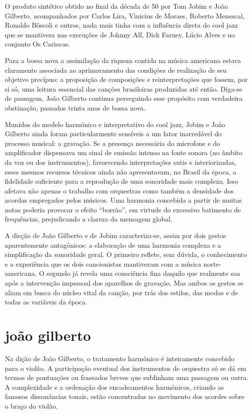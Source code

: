 O produto sintético obtido no final da década de 50 por Tom Jobim e João
Gilberto, acompanhados por Carlos Lira, Vinicius de Moraes, Roberto
Menescal, Ronaldo Bôscoli e outros, nada mais tinha com a influência
direta do cool jazz que se mantivera nas execuções de Johnny Alf, Dick
Farney, Lúcio Alves e no conjunto Os Cariocas.

Para a bossa nova a assimilação da riqueza contida na música americana
estava claramente associada ao aprimoramento das condições de realização
de seu objetivo precípuo: a proposição de composições e reinterpretações
que fossem, por si só, uma leitura essencial das canções brasileiras
produzidas até então. Diga-se de passagem, João Gilberto continua
perseguindo esse propósito com verdadeira obstinação, passados trinta
anos de bossa nova.

Munidos do modelo harmônico e interpretativo do cool jazz, Jobim e João
Gilberto ainda foram particularmente sensíveis a um fator inarredável do
processo musical: a gravação. Se a presença necessária do microfone e do
amplificador dispensava um sinal de emissão intenso na fonte sonora (no
âmbito da voz ou dos instrumentos), favorecendo interpretações sutis e
interiorizadas, esses mesmos recursos técnicos ainda não apresentavam,
no Brasil da época, a fidelidade suficiente para a reprodução de uma
sonoridade mais complexa. Isso afetava não apenas o trabalho com
orquestras como também a densidade dos acordas empregados pelos músicos.
Uma harmonia concebida a partir de muitas notas poderia provocar o
efeito ``borrão'', em virtude do excessivo batimento de frequências,
prejudicando a clareza da mensagem global.

A dicção de João Gilberto e de Jobim caracteriza-se, assim por dois
gestos aparentemente antagônicos: a elaboração de uma harmonia complexa
e a simplificação da sonoridade geral. O primeiro reflete, sem dúvida, o
conhecimento e a experiência que os dois cancionistas mantiveram com a
música norte-americana. O segundo já revela uma consciência fina daquilo
que realmente soa após a intervenção impessoal dos aparelhos de
gravação. Mas ambos os gestos se aliam em busca do núcleo vital da
canção, por trás dos estilos, das modas e de todas as variáveis da
época.

\section{joão gilberto}

Na dição de João Gilberto, o tratamento harmônico é inteiramente
concebido para o violão. A participação eventual dos instrumentos de
orquestra só se dá em termos de pontuações ou fraseados breves que
sublinham uma passagem ou outra. A complexidade e a ordenação dos
encadeamentos harmônicos, criando as famosas dissonâncias tonais, estão
concentradas no movimento dos acordes sobre o braço do violão.

